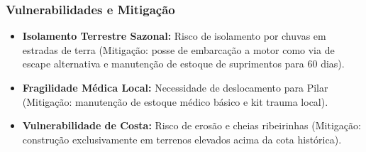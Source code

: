 \subsubsection{Vulnerabilidades e
Mitigação}

\begin{itemize}
\tightlist
\item
  \textbf{Isolamento Terrestre Sazonal:} Risco de isolamento por chuvas
  em estradas de terra (Mitigação: posse de embarcação a motor como via
  de escape alternativa e manutenção de estoque de suprimentos para 60
  dias).
\item
  \textbf{Fragilidade Médica Local:} Necessidade de deslocamento para
  Pilar (Mitigação: manutenção de estoque médico básico e kit trauma
  local).
\item
  \textbf{Vulnerabilidade de Costa:} Risco de erosão e cheias
  ribeirinhas (Mitigação: construção exclusivamente em terrenos elevados
  acima da cota histórica).
\end{itemize}


